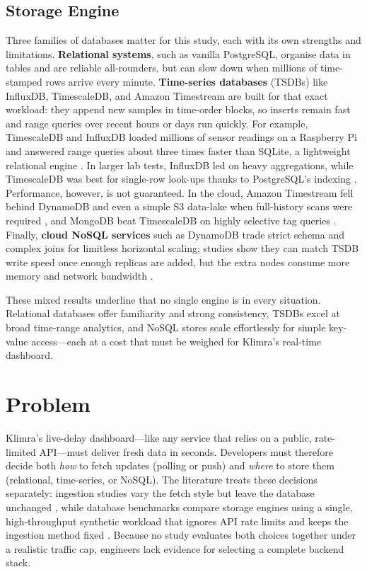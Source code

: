 \documentclass[nomenclature, english, biblatex]{kththesis}
\numberwithin{listing}{chapter}
\begin{document}
\subsection{Storage Engine}
Three families of databases matter for this study, each with its own strengths and limitations.
\textbf{Relational systems}, such as vanilla PostgreSQL, organise data in tables and are reliable all-rounders, but can slow down when millions of time-stamped rows arrive every minute.
\textbf{Time-series databases} (\glspl{TSDB}) like InfluxDB, TimescaleDB, and Amazon Timestream are built for that exact workload: they append new samples in time-order blocks, so inserts remain fast and range queries over recent hours or days run quickly. For example, TimescaleDB and InfluxDB loaded millions of sensor readings on a Raspberry Pi and answered range queries about three times faster than SQLite, a lightweight relational engine \cite{Grzesik2020EdgeIoTBenchmark}. In larger lab tests, InfluxDB led on heavy aggregations, while TimescaleDB was best for single-row look-ups thanks to PostgreSQL's indexing \cite{Daqouri2023TimeseriesVsSQL,Heldt2021SciTS}. Performance, however, is not guaranteed. In the cloud, Amazon Timestream fell behind DynamoDB and even a simple S3 data-lake when full-history scans were required \cite{Johansson2022AWSCloudData}, and MongoDB beat TimescaleDB on highly selective tag queries \cite{Mohamed2024DBMSComparison}.
Finally, \textbf{cloud NoSQL services} such as DynamoDB trade strict schema and complex joins for limitless horizontal scaling; studies show they can match \gls{TSDB} write speed once enough replicas are added, but the extra nodes consume more memory and network bandwidth \cite{Zhang2023EdgeTSDB,Vergara2021PerformanceTSDB}.

These mixed results underline that no single engine is  in every situation. Relational databases offer familiarity and strong consistency, \glspl{TSDB} excel at broad time-range analytics, and NoSQL stores scale effortlessly for simple key-value access—each at a cost that must be weighed for Klimra's real-time dashboard.





\section{Problem}
\label{sec:problem}

Klimra's live-delay dashboard—like any service that relies on a public, rate-limited API—must deliver fresh data in seconds. Developers must therefore decide both \textit{how} to fetch updates (polling or push) and \textit{where} to store them (relational, time-series, or NoSQL). The literature treats these decisions separately: ingestion studies vary the fetch style but leave the database unchanged \cite{Trindade2021EDAImpact,Lewis2020PowerOfEDA}, while database benchmarks compare storage engines using a single, high-throughput synthetic workload that ignores API rate limits and keeps the ingestion method fixed \cite{Heldt2021SciTS,Grzesik2020EdgeIoTBenchmark}. Because no study evaluates both choices together under a realistic traffic cap, engineers lack evidence for selecting a complete backend stack.
\end{document}
